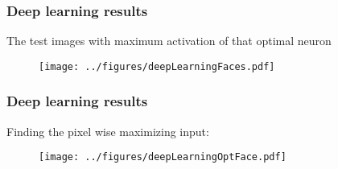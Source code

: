 \documentclass[12pt]{beamer}
\begin{document}
\begin{frame}[fragile]
\frametitle{Deep learning results}
The test images with maximum activation of that optimal neuron
\begin{figure}
\centering
\texttt{[image: ../figures/deepLearningFaces.pdf]}
\end{figure}
\end{frame}

\begin{frame}[fragile]
\frametitle{Deep learning results}
Finding the pixel wise maximizing input:
\begin{figure}
\centering
\texttt{[image: ../figures/deepLearningOptFace.pdf]}
\end{figure}
\end{frame}
\end{document}
